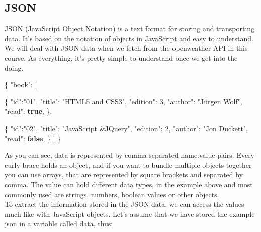 \documentclass[
]{article}
\newenvironment{Shaded}{\begin{snugshade}}{\end{snugshade}}
\newcommand{\DataTypeTok}[1]{\textcolor[rgb]{0.13,0.29,0.53}{#1}}
\newcommand{\DecValTok}[1]{\textcolor[rgb]{0.00,0.00,0.81}{#1}}
\newcommand{\FunctionTok}[1]{\textcolor[rgb]{0.00,0.00,0.00}{#1}}
\newcommand{\KeywordTok}[1]{\textcolor[rgb]{0.13,0.29,0.53}{\textbf{#1}}}
\newcommand{\OtherTok}[1]{\textcolor[rgb]{0.56,0.35,0.01}{#1}}
\newcommand{\StringTok}[1]{\textcolor[rgb]{0.31,0.60,0.02}{#1}}
\begin{document}
\hypertarget{json}{%
\subsection{JSON}\label{json}}

JSON (JavaScript Object Notation) is a text format for storing and transporting data. It's based on the notation of objects in JavaScript and easy to understand. We will deal with JSON data when we fetch from the openweather API in this course. As everything, it's pretty simple to understand once we get into the doing.

\begin{Shaded}
\begin{Highlighting}[]
\FunctionTok{\{}
   \DataTypeTok{"book"}\FunctionTok{:} \OtherTok{[}
    
      \FunctionTok{\{}
         \DataTypeTok{"id"}\FunctionTok{:}\StringTok{"01"}\FunctionTok{,}
         \DataTypeTok{"title"}\FunctionTok{:} \StringTok{"HTML5 and CSS3"}\FunctionTok{,}
         \DataTypeTok{"edition"}\FunctionTok{:} \DecValTok{3}\FunctionTok{,}
         \DataTypeTok{"author"}\FunctionTok{:} \StringTok{"Jürgen Wolf"}\FunctionTok{,}
         \DataTypeTok{"read"}\FunctionTok{:} \KeywordTok{true}\FunctionTok{,}
      \FunctionTok{\}}\OtherTok{,}
    
      \FunctionTok{\{}
         \DataTypeTok{"id"}\FunctionTok{:}\StringTok{"02"}\FunctionTok{,}
         \DataTypeTok{"title"}\FunctionTok{:} \StringTok{"JavaScript &JQuery"}\FunctionTok{,}
         \DataTypeTok{"edition"}\FunctionTok{:} \DecValTok{2}\FunctionTok{,}
         \DataTypeTok{"author"}\FunctionTok{:} \StringTok{"Jon Duckett"}\FunctionTok{,}
         \DataTypeTok{"read"}\FunctionTok{:} \KeywordTok{false}\FunctionTok{,}
      \FunctionTok{\}}
   \OtherTok{]}
\FunctionTok{\}}
\end{Highlighting}
\end{Shaded}

As you can see, data is represented by comma-separated name:value pairs. Every curly brace holds an object, and if you want to bundle multiple objects together you can use arrays, that are represented by square brackets and separated by comma. The value can hold different data types, in the example above and most commonly used are strings, numbers, boolean values or other objects.\\
To extract the information stored in the JSON data, we can access the values much like with JavaScript objects. Let's assume that we have stored the example-json in a variable called data, thus:
\end{document}
